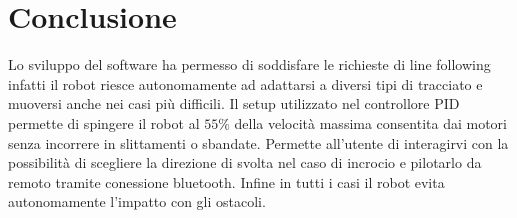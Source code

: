 \section{Conclusione}
\label{conclusione}
Lo sviluppo del software ha permesso di soddisfare le richieste di line following infatti il robot riesce autonomamente ad adattarsi a diversi tipi di tracciato e muoversi anche nei casi più difficili. Il setup utilizzato nel controllore \textsc{PID} permette di spingere il robot al $55\%$ della velocità massima consentita dai motori senza incorrere in slittamenti o sbandate. Permette all'utente di interagirvi con la possibilità di scegliere la direzione di svolta nel caso di incrocio e pilotarlo da remoto tramite conessione bluetooth. Infine in tutti i casi il robot evita autonomamente l'impatto con gli ostacoli.